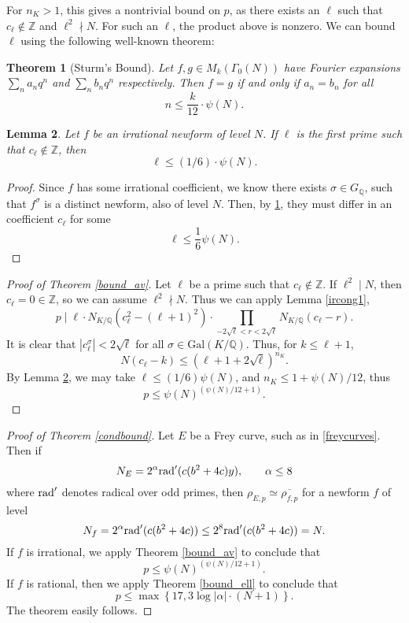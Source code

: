 \documentclass[12pt]{amsart}
\newtheorem{thm}{Theorem}[section]
\newtheorem{lem}[thm]{Lemma}
\theoremstyle{definition}
\def\Q{{\mathbb Q}}
\def\Z{{\mathbb Z}}
\newcommand{\rad}{\rm rad}
\renewcommand{\bar}{\overline}
\newcommand{\notdiv}{\nmid}
\newcommand{\Gal}{\text{Gal}}
\begin{document}
For $n_K > 1$, this gives a nontrivial bound on $p$, as there exists an $\ell$ such that $c_\ell \notin \mathbb{Z}$ and $\ell^2 \nmid N$. For such an $\ell$, the product above is nonzero. We can bound $\ell$ using the following well-known theorem:
\begin{thm}[Sturm's Bound]\label{sturm}
Let $f,g \in M_k(\Gamma_0(N))$ have Fourier expansions $\sum_n a_nq^n$ and $\sum_n b_n q^n$ respectively.  Then $f = g$ if and only if $a_n = b_n$ for all
\[ n \leq \frac{k}{12} \cdot \psi(N). \]
\end{thm}

\begin{lem}\label{boundell}
Let $f$ be an irrational newform of level $N$.  If $\ell$ is the first prime such that $c_\ell \not\in \Z$, then
\[ \ell \leq (1/6) \cdot \psi(N) .\]
\end{lem}

\begin{proof}
Since $f$ has some irrational coefficient, we know there exists $\sigma \in G_\Q$, such that $f^{\sigma}$ is a distinct newform, also of level $N$.  Then, by \ref{sturm}, they must differ in an coefficient $c_\ell$ for some 
\[ \ell \leq \frac{1}{6} \psi(N). \]
\end{proof}

\begin{proof}[Proof of Theorem \ref{bound_av}]
Let $\ell$ be a prime such that $c_\ell \notin \Z$.  If $\ell^2 \mid N$, then $c_\ell = 0 \in \Z$, so we can assume $\ell^2 \notdiv N$. Thus we can apply Lemma \ref{ircong1}, 
\[ p \mid \ell \cdot N_{K / \mathbb{Q}}(c_\ell^2-(\ell+1)^2) \cdot \prod_{-2\sqrt{\ell} < r < 2\sqrt{\ell}}{N_{K / \mathbb{Q}}}(c_\ell - r).\]
It is clear that $|c_\ell^{\sigma}| < 2\sqrt{\ell}$ for all $\sigma \in \Gal(K/\Q)$. Thus, for $k \leq \ell+1$, \[N(c_\ell - k) \leq (\ell+1 + 2\sqrt{\ell})^{n_{K}}.\] 
By Lemma \ref{boundell}, we may take $\ell \leq (1/6)\psi(N)$, and $n_{K} \leq 1+\psi(N)/12$, thus
\[ p \leq \psi(N)^{(\psi(N)/12+1)}. \]
\end{proof}
 
 
 \begin{proof}[Proof of Theorem \ref{condbound}]
 Let $E$ be a Frey curve, such as in \ref{freycurves}.  Then if
 \[N_E = 2^\alpha {\rad}'(c(b^2+4c)y), \qquad \alpha \leq 8\]
where ${\rad}'$ denotes radical over odd primes, then $\rho_{E,p} \simeq \bar{\rho_{f,p}}$ for a newform $f$ of level
\[N_f =  2^\alpha {\rad}'(c(b^2+4c))\leq 2^8  {\rad}'(c(b^2+4c)) = N.\]
 If $f$ is irrational, we apply Theorem \ref{bound_av} to conclude that
 \[ p \leq \psi(N)^{(\psi(N)/12+1)}. \]
 If $f$ is rational, then we apply Theorem \ref{bound_ell} to conclude that
 \[ p \leq \max\left\{ 17, 3 \log|\alpha| \cdot (N+1) \right\}. \]
 The theorem easily follows.
 \end{proof}
 
\end{document}
